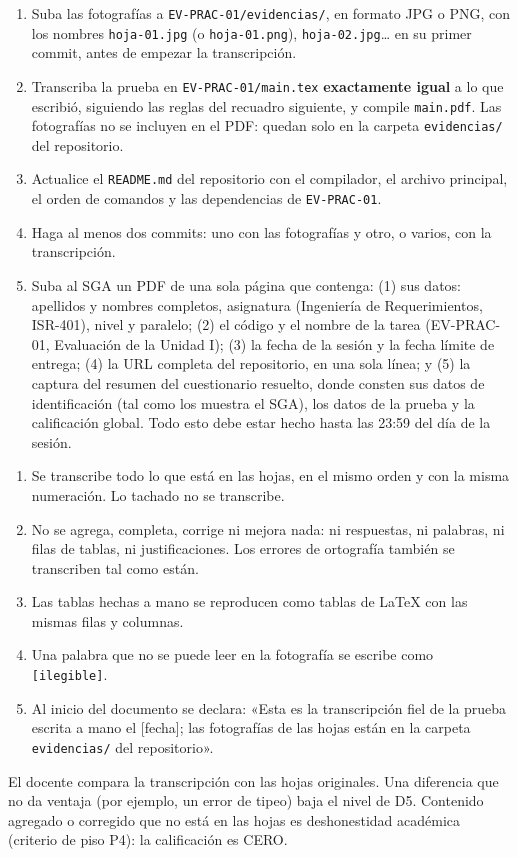 \documentclass[11pt]{article}
\begin{document}
	\begin{enumerate}[leftmargin=18pt,itemsep=2pt]
		\item Suba las fotografías a \texttt{EV-PRAC-01/evidencias/}, en formato JPG o PNG, con los nombres \texttt{hoja-01.jpg} (o \texttt{hoja-01.png}), \texttt{hoja-02.jpg}\ldots{} en su primer commit, antes de empezar la transcripción.
		\item Transcriba la prueba en \texttt{EV-PRAC-01/main.tex} \textbf{exactamente igual} a lo que escribió, siguiendo las reglas del recuadro siguiente, y compile \texttt{main.pdf}. Las fotografías no se incluyen en el PDF: quedan solo en la carpeta \texttt{evidencias/} del repositorio.
		\item Actualice el \texttt{README.md} del repositorio con el compilador, el archivo principal, el orden de comandos y las dependencias de \texttt{EV-PRAC-01}.
		\item Haga al menos dos commits: uno con las fotografías y otro, o varios, con la transcripción.
		\item Suba al SGA un PDF de una sola página que contenga: (1) sus datos: apellidos y nombres completos, asignatura (Ingeniería de Requerimientos, ISR-401), nivel y paralelo; (2) el código y el nombre de la tarea (EV-PRAC-01, Evaluación de la Unidad I); (3) la fecha de la sesión y la fecha límite de entrega; (4) la URL completa del repositorio, en una sola línea; y (5) la captura del resumen del cuestionario resuelto, donde consten sus datos de identificación (tal como los muestra el SGA), los datos de la prueba y la calificación global. Todo esto debe estar hecho hasta las 23:59 del día de la sesión.
	\end{enumerate}
	
	\begin{cajaaviso}[title={Reglas de la transcripción fiel}]
		\begin{enumerate}[label=\textbf{R\arabic*.},leftmargin=24pt,itemsep=2pt]
			\item Se transcribe todo lo que está en las hojas, en el mismo orden y con la misma numeración. Lo tachado no se transcribe.
			\item No se agrega, completa, corrige ni mejora nada: ni respuestas, ni palabras, ni filas de tablas, ni justificaciones. Los errores de ortografía también se transcriben tal como están.
			\item Las tablas hechas a mano se reproducen como tablas de \LaTeX{} con las mismas filas y columnas.
			\item Una palabra que no se puede leer en la fotografía se escribe como \texttt{[ilegible]}.
			\item Al inicio del documento se declara: «Esta es la transcripción fiel de la prueba escrita a mano el [fecha]; las fotografías de las hojas están en la carpeta \texttt{evidencias/} del repositorio».
		\end{enumerate}
		El docente compara la transcripción con las hojas originales. Una diferencia que no da ventaja (por ejemplo, un error de tipeo) baja el nivel de D5. Contenido agregado o corregido que no está en las hojas es deshonestidad académica (criterio de piso P4): la calificación es CERO.
	\end{cajaaviso}
	
\end{document}
